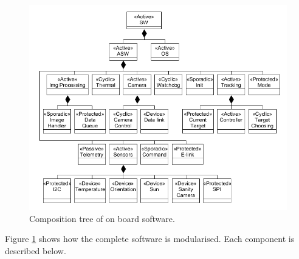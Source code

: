 \begin{figure}[H]
	\centering
	\includegraphics[width=\textwidth]{4-experiment-design/img/software/composition-tree.png}
	\caption{Composition tree of on board software.}
	\label{fig:software-composition-tree}
\end{figure}

Figure \ref{fig:software-composition-tree} shows how the complete software is modularised. Each component is described below.

